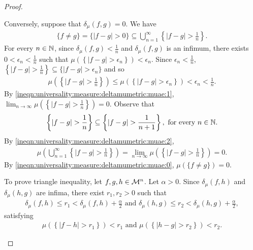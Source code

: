 \begin{proof}
\begin{step}[$\delta_\mu(f, g) = 0 \iff f = g$ $\mu$-almost everywhere]
Conversely, suppose that $\delta_\mu (f, g) = 0$. We have \begin{align}
    \label{ineqn:universality:measure:deltamumetric:muae:0}
    \{ f \neq g \} = \{ | f - g | > 0 \} \subseteq \bigcup_{n = 1}^\infty  \left \{ |f - g| > \frac{1}{n} \right \}.
\end{align}
For every $n \in {\mathbb N}$, since $\delta_\mu(f,g) < \frac{1}{n}$ and $\delta_\mu(f,g)$ is an infimum, there exists $0 < \epsilon_n < \frac{1}{n}$ such that $\mu(\left \{ | f - g| > \epsilon_n \right \}) < \epsilon_n$. Since $\epsilon_n < \frac{1}{n}$, $\left \{ | f - g | > \frac{1}{n} \right \} \subseteq \{ | f - g | > \epsilon_n \}$ and so 
\begin{align}
    \label{ineqn:universality:measure:deltamumetric:muae:1}
    \mu ( \left \{ |f - g| > \frac{1}{n} \right \}) \leq  \mu(\left \{ |f - g| > \epsilon_n \right \}) < \epsilon_n < \frac{1}{n}.
\end{align}
By \ref{ineqn:universality:measure:deltamumetric:muae:1}, $\lim_{n \to \infty} \mu ( \left \{ |f - g| > \frac{1}{n} \right \}) = 0$. Observe that \begin{align}
    \label{ineqn:universality:measure:deltamumetric:muae:2}
    \left \{ |f - g| > \frac{1}{n} \right \}\subseteq \left \{ |f - g| > \frac{1}{n + 1} \right \}, \text{ for every $n \in {\mathbb N}$.}
\end{align}
By \ref{ineqn:universality:measure:deltamumetric:muae:2}, \begin{align*}
    \mu \left(  \bigcup_{n = 1}^\infty  \left \{ |f - g| > \frac{1}{n} \right \} \right ) = \lim_{n \to \infty} \mu ( \left \{ |f - g| > \frac{1}{n} \right \}) = 0.
\end{align*}
By \ref{ineqn:universality:measure:deltamumetric:muae:0}, $\mu (\{ f \neq g \}) = 0$.
\end{step}
\begin{step}
To prove triangle inequality, let $f, g, h \in {\mathcal M}^n$. Let $\alpha > 0$. Since $\delta_\mu(f, h)$ and $\delta_\mu(h, g)$ are infima, there exist $r_1, r_2 > 0$ such that
\begin{align}
    \label{ineqn:universality:measure:deltamumetric:triangle:1}
    \delta_\mu(f, h) \leq r_1 < \delta_\mu(f, h) + \frac{\alpha}{2} \text{ and } 
    \delta_\mu(h, g) \leq r_2 < \delta_\mu(h, g) + \frac{\alpha}{2},
\end{align}
satisfying \begin{align}
    \label{ineqn:universality:measure:deltamumetric:triangle:2}
    \mu (\left \{ | f - h | > r_1 \right \} ) < r_1 \text{ and } \mu (\left \{ | h - g | > r_2 \right \} ) < r_2 .

\end{align}
\end{step}
\end{proof}

